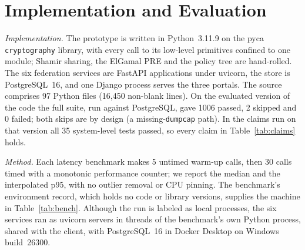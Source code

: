 \section{Implementation and Evaluation}\label{sec:eval}

\textit{Implementation.} The prototype is written in Python~3.11.9 on the pyca
\texttt{cryptography} library, with every call to its low-level primitives
confined to one module; Shamir sharing, the ElGamal PRE and the policy tree
are hand-rolled. %
The six federation services are FastAPI applications under uvicorn, the
store is PostgreSQL~16, and one Django process serves the three
portals. %
The source comprises 97 Python files (16{,}450 non-blank
lines). %
On the evaluated version of the code the full suite, run against
PostgreSQL, gave 1006 passed, 2 skipped and 0 failed; both skips are by design
(a missing-\texttt{dumpcap} path). %
In the claims run on that version all 35 system-level tests passed, so every
claim in Table~\ref{tab:claims} holds. %

\textit{Method.} Each latency benchmark makes 5 untimed warm-up calls, then
30 calls timed with a monotonic performance counter; we report the median and
the interpolated p95, with no outlier removal or CPU
pinning. %
The benchmark's environment record, which holds no code or library versions,
supplies the machine in Table~\ref{tab:bench}. %
Although the run is labeled as local processes, the six services ran as uvicorn
servers in threads of the benchmark's own Python process, shared with the
client, with PostgreSQL~16 in Docker Desktop on Windows
build~26300. %

